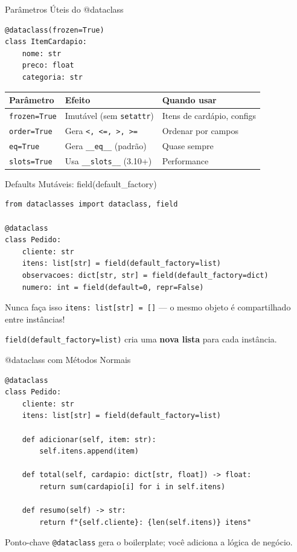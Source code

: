 \documentclass[aspectratio=169]{beamer}
\begin{document}
\begin{frame}[fragile]{Parâmetros Úteis do @dataclass}
\begin{lstlisting}
@dataclass(frozen=True)
class ItemCardapio:
    nome: str
    preco: float
    categoria: str
\end{lstlisting}

\begin{table}
\centering
\begin{tabular}{lll}
\toprule
\textbf{Parâmetro} & \textbf{Efeito} & \textbf{Quando usar} \\
\midrule
\texttt{frozen=True}  & Imutável (sem \texttt{setattr}) & Itens de cardápio, configs \\
\texttt{order=True}   & Gera \texttt{<, <=, >, >=}     & Ordenar por campos \\
\texttt{eq=True}       & Gera \texttt{\_\_eq\_\_} (padrão) & Quase sempre \\
\texttt{slots=True}   & Usa \texttt{\_\_slots\_\_} (3.10+) & Performance \\
\bottomrule
\end{tabular}
\end{table}
\end{frame}

\begin{frame}[fragile]{Defaults Mutáveis: field(default\_factory)}
\begin{lstlisting}
from dataclasses import dataclass, field

@dataclass
class Pedido:
    cliente: str
    itens: list[str] = field(default_factory=list)
    observacoes: dict[str, str] = field(default_factory=dict)
    numero: int = field(default=0, repr=False)
\end{lstlisting}

\begin{alertblock}{Nunca faça isso}
\texttt{itens: list[str] = []} --- o mesmo objeto é compartilhado entre instâncias!
\end{alertblock}

\texttt{field(default\_factory=list)} cria uma \textbf{nova lista} para cada instância.
\end{frame}

\begin{frame}[fragile]{@dataclass com Métodos Normais}
\begin{lstlisting}
@dataclass
class Pedido:
    cliente: str
    itens: list[str] = field(default_factory=list)

    def adicionar(self, item: str):
        self.itens.append(item)

    def total(self, cardapio: dict[str, float]) -> float:
        return sum(cardapio[i] for i in self.itens)

    def resumo(self) -> str:
        return f"{self.cliente}: {len(self.itens)} itens"
\end{lstlisting}

\begin{exampleblock}{Ponto-chave}
\texttt{@dataclass} gera o boilerplate; você adiciona a lógica de negócio.
\end{exampleblock}
\end{frame}
\end{document}
